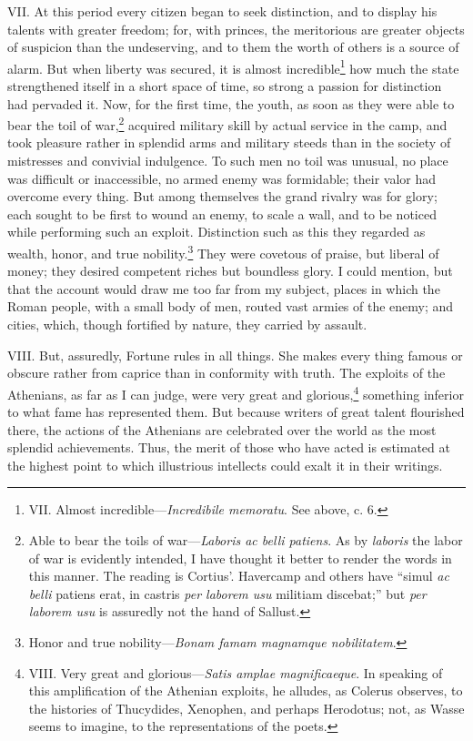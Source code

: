VII. At this period every citizen began to seek distinction, and to
display his talents with greater freedom; for, with princes, the
meritorious are greater objects of suspicion than the undeserving, and
to them the worth of others is a source of alarm. But when liberty was
secured, it is almost incredible\footnote{VII. Almost incredible—\emph{Incredibile memoratu}. See above, c. 6.} how much the state strengthened
itself in a short space of time, so strong a passion for distinction
had pervaded it. Now, for the first time, the youth, as soon as they
were able to bear the toil of war,\footnote{Able to bear the toils of war—\emph{Laboris ac belli patiens}.
As by \emph{laboris} the labor of war is evidently intended, I have thought
it better to render the words in this manner. The reading is Cortius'.
Havercamp and others have ``simul \emph{ac belli} patiens erat, in castris
\emph{per laborem usu} militiam discebat;'' but \emph{per laborem usu} is
assuredly not the hand of Sallust.} acquired military skill by
actual service in the camp, and took pleasure rather in splendid arms
and military steeds than in the society of mistresses and convivial
indulgence. To such men no toil was unusual, no place was difficult or
inaccessible, no armed enemy was formidable; their valor had overcome
every thing. But among themselves the grand rivalry was for glory;
each sought to be first to wound an enemy, to scale a wall, and to be
noticed while performing such an exploit. Distinction such as this
they regarded as wealth, honor, and true nobility.\footnote{Honor and true nobility—\emph{Bonam famam magnamque nobilitatem}.} They were
covetous of praise, but liberal of money; they desired competent
riches but boundless glory. I could mention, but that the account
would draw me too far from my subject, places in which the Roman
people, with a small body of men, routed vast armies of the enemy; and
cities, which, though fortified by nature, they carried by assault.

VIII. But, assuredly, Fortune rules in all things. She makes every
thing famous or obscure rather from caprice than in conformity with
truth. The exploits of the Athenians, as far as I can judge, were very
great and glorious,\footnote{VIII. Very great and glorious—\emph{Satis amplae magnificaeque}.
In speaking of this amplification of the Athenian exploits, he
alludes, as Colerus observes, to the histories of Thucydides,
Xenophen, and perhaps Herodotus; not, as Wasse seems to imagine,
to the representations of the poets.} something inferior to what fame has represented
them. But because writers of great talent flourished there, the actions
of the Athenians are celebrated over the world as the most splendid
achievements. Thus, the merit of those who have acted is estimated at
the highest point to which illustrious intellects could exalt it in
their writings.

